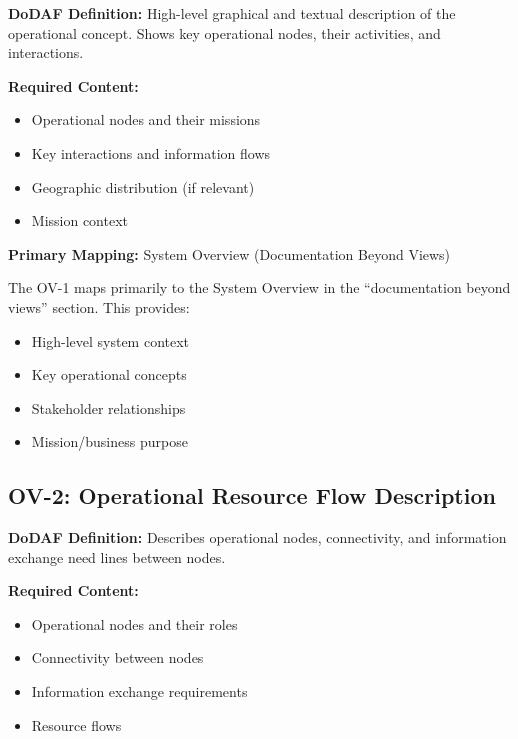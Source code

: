 \documentclass[11pt]{article}
\begin{document}
\begin{dodafbox}
\textbf{DoDAF Definition:} High-level graphical and textual description of the operational concept. Shows key operational nodes, their activities, and interactions.

\textbf{Required Content:}
\begin{itemize}[nosep]
    \item Operational nodes and their missions
    \item Key interactions and information flows
    \item Geographic distribution (if relevant)
    \item Mission context
\end{itemize}
\end{dodafbox}

\begin{vbbox}
\textbf{Primary Mapping:} System Overview (Documentation Beyond Views)

The OV-1 maps primarily to the System Overview in the ``documentation beyond views'' section. This provides:
\begin{itemize}
    \item High-level system context
    \item Key operational concepts
    \item Stakeholder relationships
    \item Mission/business purpose
\end{itemize}
\end{vbbox}

\subsection{OV-2: Operational Resource Flow Description}

\begin{dodafbox}
\textbf{DoDAF Definition:} Describes operational nodes, connectivity, and information exchange need lines between nodes.

\textbf{Required Content:}
\begin{itemize}[nosep]
    \item Operational nodes and their roles
    \item Connectivity between nodes
    \item Information exchange requirements
    \item Resource flows
\end{itemize}
\end{dodafbox}
\end{document}
